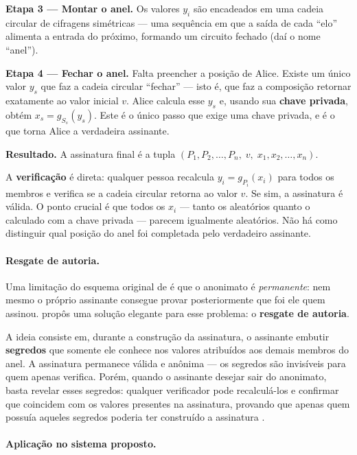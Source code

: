 \textbf{Etapa 3 --- Montar o anel.} Os valores $y_i$ são encadeados em uma cadeia circular de cifragens simétricas --- uma sequência em que a saída de cada ``elo'' alimenta a entrada do próximo, formando um circuito fechado (daí o nome ``anel'').

\textbf{Etapa 4 --- Fechar o anel.} Falta preencher a posição de Alice. Existe um único valor $y_s$ que faz a cadeia circular ``fechar'' --- isto é, que faz a composição retornar exatamente ao valor inicial $v$. Alice calcula esse $y_s$ e, usando sua \textbf{chave privada}, obtém $x_s = g_{S_s}(y_s)$. Este é o único passo que exige uma chave privada, e é o que torna Alice a verdadeira assinante.

\textbf{Resultado.} A assinatura final é a tupla $(P_1, P_2, \ldots, P_n,\; v,\; x_1, x_2, \ldots, x_n)$.

A \textbf{verificação} é direta: qualquer pessoa recalcula $y_i = g_{P_i}(x_i)$ para todos os membros e verifica se a cadeia circular retorna ao valor $v$. Se sim, a assinatura é válida. O ponto crucial é que todos os $x_i$ --- tanto os aleatórios quanto o calculado com a chave privada --- parecem igualmente aleatórios. Não há como distinguir qual posição do anel foi completada pelo verdadeiro assinante.

\paragraph{Resgate de autoria.}

Uma limitação do esquema original de  é que o anonimato é \textit{permanente}: nem mesmo o próprio assinante consegue provar posteriormente que foi ele quem assinou.  propôs uma solução elegante para esse problema: o \textbf{resgate de autoria}.

A ideia consiste em, durante a construção da assinatura, o assinante embutir \textbf{segredos} que somente ele conhece nos valores atribuídos aos demais membros do anel. A assinatura permanece válida e anônima --- os segredos são invisíveis para quem apenas verifica. Porém, quando o assinante desejar sair do anonimato, basta revelar esses segredos: qualquer verificador pode recalculá-los e confirmar que coincidem com os valores presentes na assinatura, provando que apenas quem possuía aqueles segredos poderia ter construído a assinatura \cite{tomaz2014}.

\paragraph{Aplicação no sistema proposto.}

